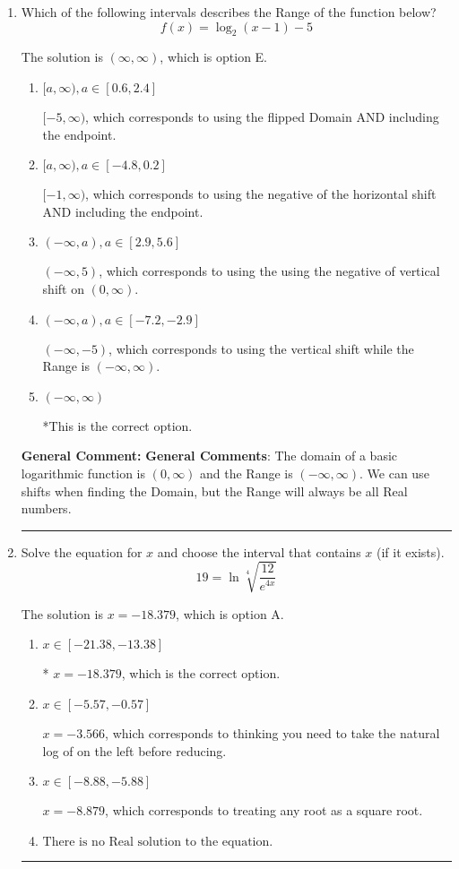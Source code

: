 \documentclass{extbook}[14pt]
\newcommand{\litem}[1]{\item #1

\rule{\textwidth}{0.4pt}}
\begin{document}
\begin{enumerate}\litem{
Which of the following intervals describes the Range of the function below?
\[ f(x) = \log_2{(x-1)}-5 \]

The solution is \( (\infty, \infty) \), which is option E.\begin{enumerate}[label=\Alph*.]
\item \( [a, \infty), a \in [0.6, 2.4] \)

$[-5, \infty)$, which corresponds to using the flipped Domain AND including the endpoint.
\item \( [a, \infty), a \in [-4.8, 0.2] \)

$[-1, \infty)$, which corresponds to using the negative of the horizontal shift AND including the endpoint.
\item \( (-\infty, a), a \in [2.9, 5.6] \)

$(-\infty, 5)$, which corresponds to using the using the negative of vertical shift on $(0, \infty)$.
\item \( (-\infty, a), a \in [-7.2, -2.9] \)

$(-\infty, -5)$, which corresponds to using the vertical shift while the Range is $(-\infty, \infty)$.
\item \( (-\infty, \infty) \)

*This is the correct option.
\end{enumerate}

\textbf{General Comment:} \textbf{General Comments}: The domain of a basic logarithmic function is $(0, \infty)$ and the Range is $(-\infty, \infty)$. We can use shifts when finding the Domain, but the Range will always be all Real numbers.
}
\litem{
 Solve the equation for $x$ and choose the interval that contains $x$ (if it exists).
\[  19 = \ln{\sqrt[4]{\frac{12}{e^{4x}}}} \]

The solution is \( x = -18.379 \), which is option A.\begin{enumerate}[label=\Alph*.]
\item \( x \in [-21.38, -13.38] \)

* $x = -18.379$, which is the correct option.
\item \( x \in [-5.57, -0.57] \)

$x = -3.566$, which corresponds to thinking you need to take the natural log of on the left before reducing.
\item \( x \in [-8.88, -5.88] \)

$x = -8.879$, which corresponds to treating any root as a square root.
\item \( \text{There is no Real solution to the equation.} \)


\end{enumerate}}
\end{enumerate}
\end{document}
